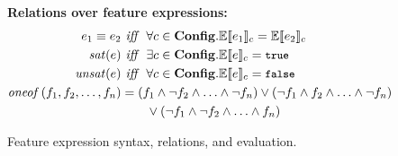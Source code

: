 \begin{figure}
\medskip
\textbf{Relations over feature expressions:}
\begin{alignat*}{1}
\dimMeta_1 \equiv \dimMeta_2 &\textit{ iff \ } \forall \config \in \confSet. \fSem {\dimMeta_1} = \fSem {\dimMeta_2}\\
\sat {\dimMeta} &\textit{ iff \ } \exists \config \in \confSet. \fSem {\dimMeta} = \t\\
\unsat {\dimMeta} &\textit{ iff \ } \forall \config \in \confSet. \fSem {\dimMeta} = \f\\
\oneof {\A, \B, \ldots, \fName_n}
&= (\A \wedge \neg \B \wedge \ldots \wedge \neg \fName_n)
\vee (\neg \A \wedge \B \wedge \ldots \wedge \neg \fName_n)\\
&\qquad\vee (\neg \A \wedge \neg \B \wedge \ldots \wedge \fName_n)
\end{alignat*}



\begin{comment}
\medskip
\textbf{Configuration constraint:}
\begin{equation*}
\forall \overrightarrow{f_i} \in c :
\bigvee_{1\leq j \leq |f_i|}(\neg o_j \wedge \bigwedge_{\substack{k\not = j\\1 \leq k\leq |f_i|}} o_k)
= \prog{true}
\end{equation*}
\end{comment}

\caption[Feature expression syntax and evaluation]{Feature expression syntax, relations, and evaluation.
}
\label{fig:fexp-def}
\end{figure}

